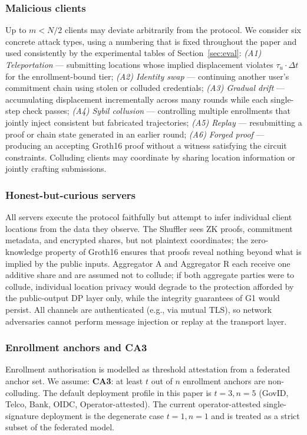 \documentclass[conference]{IEEEtran}
\theoremstyle{definition}
\theoremstyle{plain}
\begin{document}
\subsubsection*{Malicious clients}
Up to $m < N/2$ clients may deviate arbitrarily from the protocol.
We consider six concrete attack types, using a numbering that is fixed
throughout the paper and used consistently by the experimental tables
of Section~\ref{sec:eval}:
\emph{(A1) Teleportation} --- submitting locations whose implied
displacement violates $\tau_u\!\cdot\!\Delta t$ for the enrollment-bound tier;
\emph{(A2) Identity swap} --- continuing another user's commitment chain
using stolen or colluded credentials;
\emph{(A3) Gradual drift} --- accumulating displacement incrementally
across many rounds while each single-step check passes;
\emph{(A4) Sybil collusion} --- controlling multiple enrollments that
jointly inject consistent but fabricated trajectories;
\emph{(A5) Replay} --- resubmitting a proof or chain state generated in
an earlier round;
\emph{(A6) Forged proof} --- producing an accepting Groth16 proof
without a witness satisfying the circuit constraints.
Colluding clients may coordinate by sharing location information or
jointly crafting submissions.

\subsubsection*{Honest-but-curious servers}
All servers execute the protocol faithfully but attempt to infer
individual client locations from the data they observe.
The Shuffler sees ZK proofs, commitment metadata, and encrypted
shares, but not plaintext coordinates; the zero-knowledge property
of Groth16 ensures that proofs reveal
nothing beyond what is implied by the public inputs.
Aggregator A and Aggregator R each receive one additive share and
are assumed not to collude; if both aggregate parties were to
collude, individual location privacy would degrade to the protection
afforded by the public-output DP layer only, while the integrity
guarantees of G1 would persist.
All channels are authenticated (e.g., via mutual TLS), so network
adversaries cannot perform message injection or replay at the
transport layer.

\subsubsection*{Enrollment anchors and CA3}
Enrollment authorisation is modelled as threshold attestation from a
federated anchor set. We assume:
\textbf{CA3}: at least $t$ out of $n$ enrollment anchors are non-colluding.
The default deployment profile in this paper is $t{=}3,n{=}5$
(GovID, Telco, Bank, OIDC, Operator-attested). The current
operator-attested single-signature deployment is the degenerate case
$t{=}1,n{=}1$ and is treated as a strict subset of the federated model.
\end{document}
